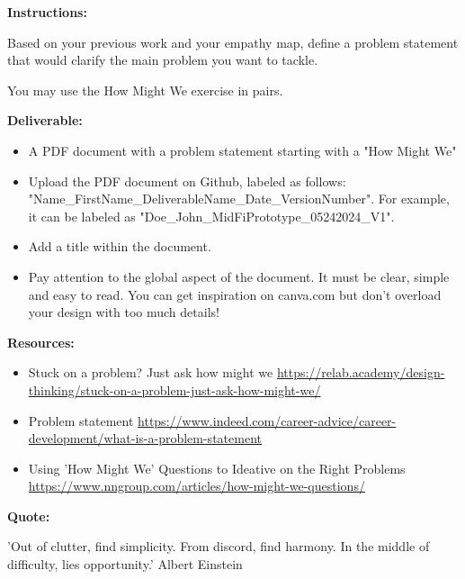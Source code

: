 \makeheaderfiles

\textbf{Instructions:}

Based on your previous work and your empathy map, define a problem statement that would clarify the main problem you want to tackle.

You may use the How Might We exercise in pairs.

\textbf{Deliverable:}

\begin{itemize}
\item A PDF document with a problem statement starting with a "How Might We"
\item Upload the PDF document on Github, labeled as follows: "Name\_FirstName\_DeliverableName\_Date\_VersionNumber". For example, it can be labeled as "Doe\_John\_MidFiPrototype\_05242024\_V1".
\item Add a title within the document.
\item Pay attention to the global aspect of the document. It must be clear, simple and easy to read. You can get inspiration on canva.com but don't overload your design with too much details!
\end{itemize}

\textbf{Resources:}

\begin{itemize}
\item Stuck on a problem? Just ask how might we \url{https://relab.academy/design-thinking/stuck-on-a-problem-just-ask-how-might-we/}
\item Problem statement \url{https://www.indeed.com/career-advice/career-development/what-is-a-problem-statement}
\item Using 'How Might We' Questions to Ideative on the Right Problems \url{https://www.nngroup.com/articles/how-might-we-questions/}
\end{itemize}

\textbf{Quote:}

'Out of clutter, find simplicity. From discord, find harmony. In the middle of difficulty, lies opportunity.' Albert Einstein

